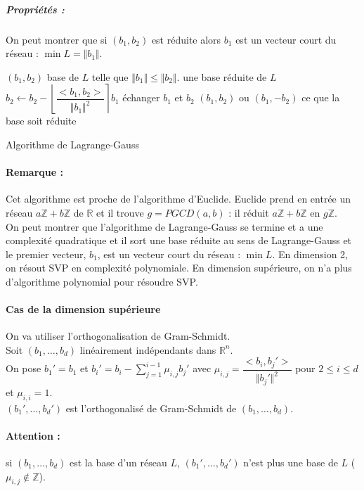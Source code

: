 \documentclass[12pt,a4paper]{report}
\begin{document}
\subparagraph{Propriétés :\\}
On peut montrer que si $(b_1,b_2)$ est réduite alors $b_1$ est un vecteur court du réseau : $\min L = \Vert b_1 \Vert $.
\begin{algorithm}[h!]
\begin{algorithmic}
\REQUIRE $(b_1,b_2)$ base de $L$ telle que $\Vert b_1 \Vert \leqslant \Vert b_2 \Vert $.
\ENSURE une base réduite de $L$
\REPEAT
\STATE $b_2 \leftarrow b_2 - \left\lfloor \dfrac{<b_1,b_2>}{\Vert b_1 \Vert ^2} \right\rceil b_1 $
\STATE échanger $b_1$ et $b_2$
\ELSE \RETURN $(b_1,b_2)$ ou \RETURN $(b_1,-b_2)$
\ENDIF
\UNTIL ce que la base soit réduite
\end{algorithmic}
\caption{Algorithme de Lagrange-Gauss}
\end{algorithm}

\paragraph{Remarque :\\}
Cet algorithme est proche de l'algorithme d'Euclide. Euclide prend en entrée un réseau $a\mathbb{Z}+b\mathbb{Z}$ de $\mathbb{R}$ et il trouve $g= PGCD(a,b)$ : il réduit $a\mathbb{Z}+b\mathbb{Z}$ en $g\mathbb{Z}$.\\
On peut montrer que l'algorithme de Lagrange-Gauss se termine et a une complexité quadratique et il sort une base réduite au sens de Lagrange-Gauss et le premier vecteur, $b_1$, est un vecteur court du réseau : $\min L$. En dimension 2, on résout SVP en complexité polynomiale. En dimension supérieure, on n'a plus d'algorithme polynomial pour résoudre SVP.
\paragraph{Cas de la dimension supérieure\\}
On va utiliser l'orthogonalisation de Gram-Schmidt.\\
Soit $(b_1,\ldots,b_d)$ linéairement indépendants dans $\mathbb{R}^n$.\\
On pose $b_1' = b_1$ et $b_i' = b_i - \displaystyle \sum_{j=1}^{i-1} \mu_{i,j} b_j'$ avec $\mu_{i,j} = \dfrac{<b_i,b_j'>}{\Vert b_j' \Vert ^2}$ pour $2\leqslant i \leqslant d$ et $\mu_{i,i}=1$.\\
$(b_1',\ldots,b_d')$ est l'orthogonalisé de Gram-Schmidt de $(b_1,\ldots,b_d)$.
\paragraph{Attention :} si $(b_1,\ldots,b_d)$ est la base d'un réseau $L$, $(b_1',\ldots,b_d')$ n'est plus une base de $L$ ($\mu_{i,j} \not \in \mathbb{Z}$).
\end{document}
